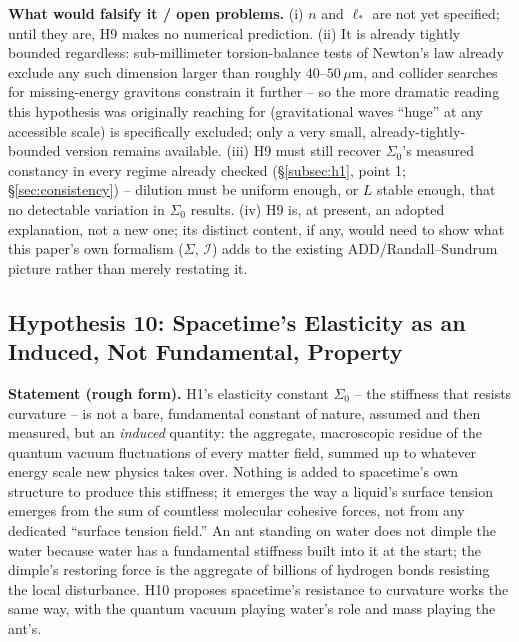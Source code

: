 \documentclass[12pt, a4paper]{article}
\begin{document}
\textbf{What would falsify it / open problems.}
(i) $n$ and $\ell_\ast$ are not yet specified; until they are, H9
makes no numerical prediction. (ii) It is already tightly bounded
regardless: sub-millimeter torsion-balance tests of Newton's law
already exclude any such dimension larger than roughly
$40$--$50\,\mu\mathrm{m}$, and collider searches for missing-energy
gravitons constrain it further -- so the more dramatic reading this
hypothesis was originally reaching for (gravitational waves ``huge''
at any accessible scale) is specifically excluded; only a very small,
already-tightly-bounded version remains available. (iii) H9 must
still recover $\Sigma_0$'s measured constancy in every regime already
checked (\S\ref{subsec:h1}, point 1; \S\ref{sec:consistency}) --
dilution must be uniform enough, or $L$ stable enough, that no
detectable variation in $\Sigma_0$ results. (iv) H9 is, at present, an
adopted explanation, not a new one; its distinct content, if any,
would need to show what this paper's own formalism ($\Sigma$,
$\mathcal{I}$) adds to the existing ADD/Randall--Sundrum picture
rather than merely restating it.

\subsection{Hypothesis 10: Spacetime's Elasticity as an Induced, Not Fundamental, Property}
\label{subsec:h10}
\textbf{Statement (rough form).} H1's elasticity constant $\Sigma_0$
-- the stiffness that resists curvature -- is not a bare, fundamental
constant of nature, assumed and then measured, but an \emph{induced}
quantity: the aggregate, macroscopic residue of the quantum vacuum
fluctuations of every matter field, summed up to whatever energy
scale new physics takes over. Nothing is added to spacetime's own
structure to produce this stiffness; it emerges the way a liquid's
surface tension emerges from the sum of countless molecular cohesive
forces, not from any dedicated ``surface tension field.'' An ant
standing on water does not dimple the water because water has a
fundamental stiffness built into it at the start; the dimple's
restoring force is the aggregate of billions of hydrogen bonds
resisting the local disturbance. H10 proposes spacetime's resistance
to curvature works the same way, with the quantum vacuum playing
water's role and mass playing the ant's.
\end{document}
